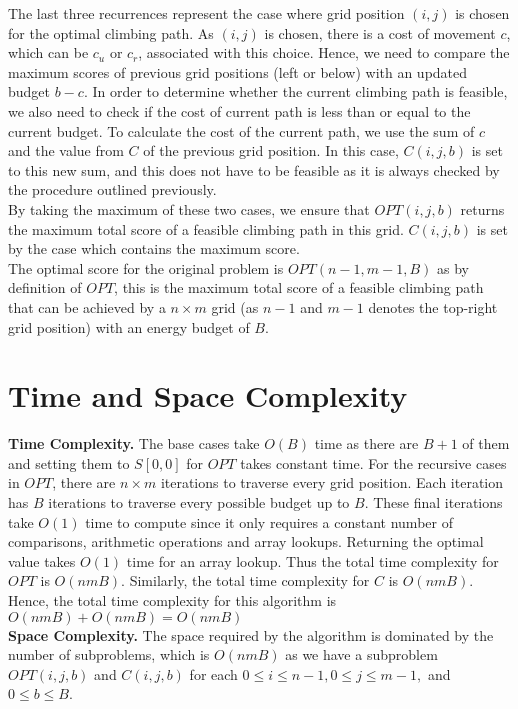 \documentclass{article}
\begin{document}
    The last three recurrences represent the case where grid position $(i,j)$ is chosen for the optimal climbing path. As $(i,j)$ is chosen, there is a cost of movement $c$, which can be $c_u$ or $c_r$, associated with this choice. Hence, we need to compare the maximum scores of previous grid positions (left or below) with an updated budget $b - c$. In order to determine whether the current climbing path is feasible, we also need to check if the cost of current path is less than or equal to the current budget. To calculate the cost of the current path, we use the sum of $c$ and the value from $C$ of the previous grid position. In this case, $C(i,j,b)$ is set to this new sum, and this does not have to be feasible as it is always checked by the procedure outlined previously. 
    \\
    
    By taking the maximum of these two cases, we ensure that $OPT(i,j,b)$ returns the maximum total score of a feasible climbing path in this grid. $C(i,j,b)$ is set by the case which contains the maximum score.
    \\
    
    The optimal score for the original problem is $OPT(n-1,m-1,B)$ as by definition of $OPT$, this is the maximum total score of a feasible climbing path that can be achieved by a $n \times m$ grid (as $n-1$ and $m-1$ denotes the top-right grid position) with an energy budget of $B$.  

    \section*{Time and Space Complexity}
    \textbf{Time Complexity.} The base cases take $O(B)$ time as there are $B + 1$ of them and setting them to $S[0,0]$ for $OPT$ takes constant time. For the recursive cases in $OPT$, there are $n \times m$ iterations to traverse every grid position. Each iteration has $B$ iterations to traverse every possible budget up to $B$. These final iterations take $O(1)$ time to compute since it only requires a constant number of comparisons, arithmetic operations and array lookups. Returning the optimal value takes $O(1)$ time for an array lookup. Thus the total time complexity for $OPT$ is $O(nmB)$. Similarly, the total time complexity for $C$ is $O(nmB)$. Hence, the total time complexity for this algorithm is $O(nmB) + O(nmB) = O(nmB)$
    \\
    
    \textbf{Space Complexity.} The space required by the algorithm is dominated by the number of subproblems, which is $O(nmB)$ as we have a subproblem $OPT(i,j,b)$ and $C(i,j,b)$ for each $0 \leq i \leq n - 1, 0 \leq j \leq m - 1,$ and $0 \leq b \leq B$.
\end{document}

